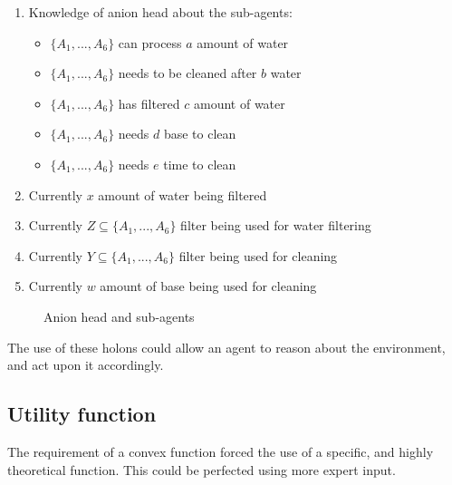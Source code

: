 \begin{enumerate}
	\item
	Knowledge of anion head about the sub-agents:
	\begin{itemize}
		\item {$\{A_1, ..., A_6\}$ can process $a$ amount of water}
		\item {$\{A_1, ..., A_6\}$ needs to be cleaned after $b$ water}
		\item {$\{A_1, ..., A_6\}$ has filtered $c$ amount of water}
		\item {$\{A_1, ..., A_6\}$ needs $d$ base to clean}
		\item {$\{A_1, ..., A_6\}$ needs $e$ time to clean}
	\end{itemize}
	\item
	Currently $x$ amount of water being filtered 
	\item
	Currently $Z \subseteq \{A_1, ..., A_6\}$ filter being used for water filtering
	\item
	Currently $Y \subseteq \{A_1, ..., A_6\}$ filter being used for cleaning
	\item
	Currently $w$ amount of base being used for cleaning
\end{enumerate}

\begin{figure}[h]
	
	\centering
	\caption{Anion head and sub-agents}
	\label{fig:anion-head-sub}
	
\end{figure}
The use of these holons could allow an agent to reason about the environment, and act upon it accordingly.

\subsection{Utility function}
The requirement of a convex function forced the use of a specific, and highly theoretical function. This could be perfected using more expert input.
